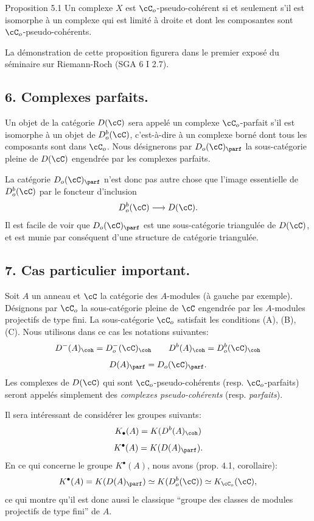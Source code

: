 \begin{statement}{Proposition 5.1}
Un complexe $X$ est $\cC_o$-pseudo-cohérent si et seulement s'il est isomorphe à un complexe qui est limité à droite et dont les composantes sont $\cC_o$-pseudo-cohérents.
\end{statement}

La démonstration de cette proposition figurera dans le premier exposé du séminaire sur Riemann-Roch (SGA 6 I 2.7).

\subsection*{6. Complexes parfaits.}

Un objet de la catégorie $D(\cC)$ sera appelé un complexe $\cC_o$-parfait s'il est isomorphe à un objet de $D_o^b(\cC)$, c'est-à-dire à un complexe borné dont tous les composants sont dans $\cC_o$. Nous désignerons par $D_o(\cC)_{\parf}$ la sous-catégorie pleine de $D(\cC)$ engendrée par les complexes parfaits.

La catégorie $D_o(\cC)_{\parf}$ n'est donc pas autre chose que l'image essentielle de $D_o^b(\cC)$ par le foncteur d'inclusion
\[
D_o^b(\cC)\longrightarrow D(\cC).
\]
Il est facile de voir que $D_o(\cC)_{\parf}$ est une sous-catégorie triangulée de $D(\cC)$, et est munie par conséquent d'une structure de catégorie triangulée.

\subsection*{7. Cas particulier important.}

Soit $A$ un anneau et $\cC$ la catégorie des $A$-modules (à gauche par exemple). Désignons par $\cC_o$ la sous-catégorie pleine de $\cC$ engendrée par les $A$-modules projectifs de type fini. La sous-catégorie $\cC_o$ satisfait les conditions (A), (B), 
(C).
Nous utilisons dans ce cas les notations suivantes:
\[
D^-(A)_{\coh}=D_o^-(\cC)_{\coh}\qquad
D^b(A)_{\coh}=D_o^b(\cC)_{\coh}
\]
\[
D(A)_{\parf}=D_o(\cC)_{\parf}.
\]
Les complexes de $D(\cC)$ qui sont $\cC_o$-pseudo-cohérents (resp. $\cC_o$-parfaits) seront appelés simplement des \emph{complexes pseudo-cohérents} (resp. \emph{parfaits}).

Il sera intéressant de considérer les groupes suivants:
\[
K_\bullet(A)=K(D^b(A)_{\coh})
\]
\[
K^\bullet(A)=K(D(A)_{\parf}).
\]
En ce qui concerne le groupe $K^\bullet(A)$, nous avons (prop. 4.1, corollaire):
\[
K^\bullet(A)=K(D(A)_{\parf})\simeq K(D_o^b(\cC))\simeq K_{\cC_o}(\cC),
\]
ce qui montre qu'il est donc aussi le classique ``groupe des classes de modules projectifs de type fini'' de $A$.

